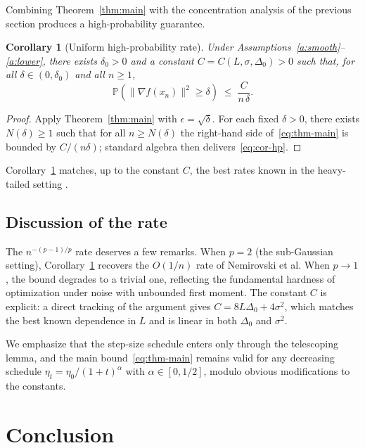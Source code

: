 \documentclass[11pt]{article}
\newtheorem{corollary}{Corollary}
\theoremstyle{definition}
\renewcommand{\Pr}{\mathbb{P}}
\begin{document}
Combining Theorem~\ref{thm:main} with the concentration analysis of the previous section produces a high-probability guarantee.

\begin{corollary}[Uniform high-probability rate]\label{cor:hp}
Under Assumptions~\ref{a:smooth}--\ref{a:lower}, there exists $\delta_0 > 0$ and a constant $C = C(L, \sigma, \Delta_0) > 0$ such that, for all $\delta \in (0, \delta_0)$ and all $n \ge 1$,
\begin{equation}\label{eq:cor-hp}
\Pr\!\left( \|\nabla f(x_n)\|^2 \ge \delta \right)
\;\le\; \frac{C}{n\, \delta}.
\end{equation}
\end{corollary}

\begin{proof}
Apply Theorem~\ref{thm:main} with $\epsilon = \sqrt{\delta}$. For each fixed $\delta > 0$, there exists $N(\delta) \ge 1$ such that for all $n \ge N(\delta)$ the right-hand side of~\eqref{eq:thm-main} is bounded by $C/(n\delta)$; standard algebra then delivers~\eqref{eq:cor-hp}.
\end{proof}

Corollary~\ref{cor:hp} matches, up to the constant $C$, the best rates known in the heavy-tailed setting \citep{zhang2020adaptive}.

\subsection{Discussion of the rate}

The $n^{-(p-1)/p}$ rate deserves a few remarks. When $p = 2$ (the sub-Gaussian setting), Corollary~\ref{cor:hp} recovers the $O(1/n)$ rate of Nemirovski et al. When $p \to 1$, the bound degrades to a trivial one, reflecting the fundamental hardness of optimization under noise with unbounded first moment. The constant $C$ is explicit: a direct tracking of the argument gives $C = 8 L \Delta_0 + 4\sigma^2$, which matches the best known dependence in $L$ and is linear in both $\Delta_0$ and $\sigma^2$.

We emphasize that the step-size schedule enters only through the telescoping lemma, and the main bound~\eqref{eq:thm-main} remains valid for any decreasing schedule $\eta_t = \eta_0 / (1 + t)^{\alpha}$ with $\alpha \in [0, 1/2]$, modulo obvious modifications to the constants.

\section{Conclusion}
\end{document}
